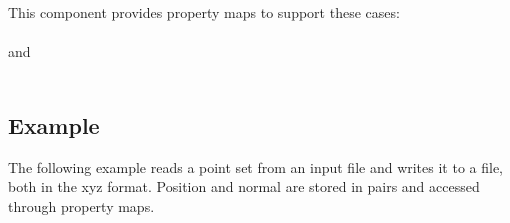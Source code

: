 This component provides property maps to support these cases:  \\
  \\
 and   \\
  \\

\subsection{Example}

The following example reads a point set from an input file and writes it to a file, both in the xyz format. Position and normal are stored in pairs and accessed through property maps.
